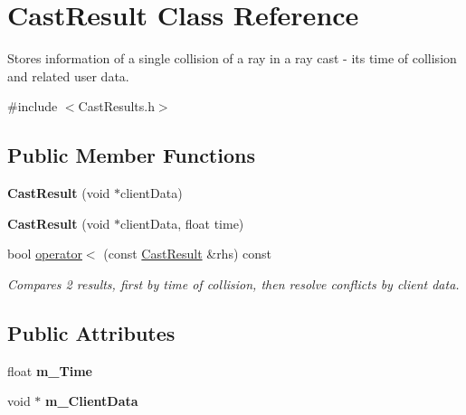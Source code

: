\hypertarget{classCastResult}{}\section{Cast\+Result Class Reference}
\label{classCastResult}


Stores information of a single collision of a ray in a ray cast -\/ its time of collision and related user data.  




{\ttfamily \#include $<$Cast\+Results.\+h$>$}

\subsection*{Public Member Functions}
\begin{DoxyCompactItemize}
\item 
\mbox{\label{classCastResult_a0bfa7f1f5b34b2a2c6846ab07e10584c}} 
{\bfseries Cast\+Result} (void $\ast$client\+Data)
\item 
\mbox{\label{classCastResult_aac9e9fc20559d0312a4a2b67472e21ad}} 
{\bfseries Cast\+Result} (void $\ast$client\+Data, float time)
\item 
bool \hyperlink{classCastResult_aa93d9222beba3f31dafeba8761ab0979}{operator$<$} (const \hyperlink{classCastResult}{Cast\+Result} \&rhs) const
\begin{DoxyCompactList}\small\item\em Compares 2 results, first by time of collision, then resolve conflicts by client data. \end{DoxyCompactList}\end{DoxyCompactItemize}
\subsection*{Public Attributes}
\begin{DoxyCompactItemize}
\item 
\mbox{\label{classCastResult_a8bdd91efbc7ac7c3cee5692bb1cd12ff}} 
float {\bfseries m\+\_\+\+Time}
\item 
\mbox{\label{classCastResult_a05176a3b71d4958ba65e99c800ecadb3}} 
void $\ast$ {\bfseries m\+\_\+\+Client\+Data}
\end{DoxyCompactItemize}


